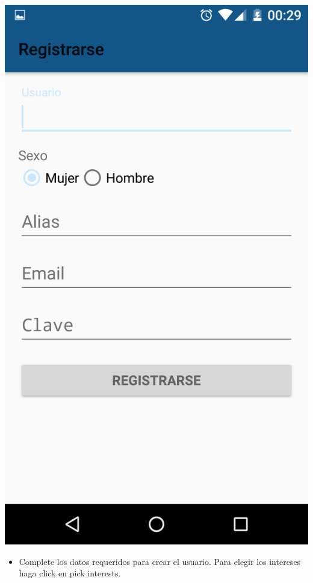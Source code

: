 \documentclass[letterpaper,10pt,english]{sphinxmanual}
\begin{document}
\includegraphics{registro.png}
\begin{itemize}
\item {} 
Complete los datos requeridos para crear el usuario. Para elegir los intereses haga click en pick interests.

\end{itemize}
\end{document}
